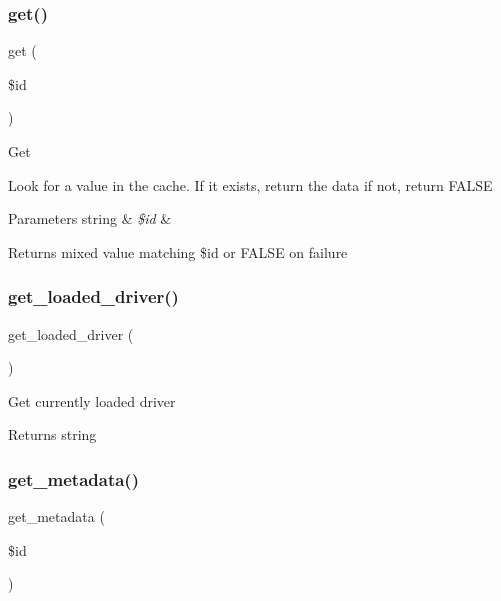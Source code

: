 \subsubsection{\texorpdfstring{get()}{get()}}
{\footnotesize\ttfamily get (\begin{DoxyParamCaption}\item[{}]{\$id }\end{DoxyParamCaption})}

Get

Look for a value in the cache. If it exists, return the data if not, return F\+A\+L\+SE


\begin{DoxyParams}[1]{Parameters}
string & {\em \$id} & \\
\hline
\end{DoxyParams}
\begin{DoxyReturn}{Returns}
mixed value matching \$id or F\+A\+L\+SE on failure 
\end{DoxyReturn}
\mbox{\label{class_c_i___cache_ae8a112b6bd3cafdbbea477683eb11918}} 
\subsubsection{\texorpdfstring{get\+\_\+loaded\+\_\+driver()}{get\_loaded\_driver()}}
{\footnotesize\ttfamily get\+\_\+loaded\+\_\+driver (\begin{DoxyParamCaption}{ }\end{DoxyParamCaption})}

Get currently loaded driver

\begin{DoxyReturn}{Returns}
string 
\end{DoxyReturn}
\mbox{\label{class_c_i___cache_a59635cf18e997c5141bffa05ff7622e0}} 
\subsubsection{\texorpdfstring{get\+\_\+metadata()}{get\_metadata()}}
{\footnotesize\ttfamily get\+\_\+metadata (\begin{DoxyParamCaption}\item[{}]{\$id }\end{DoxyParamCaption})}

